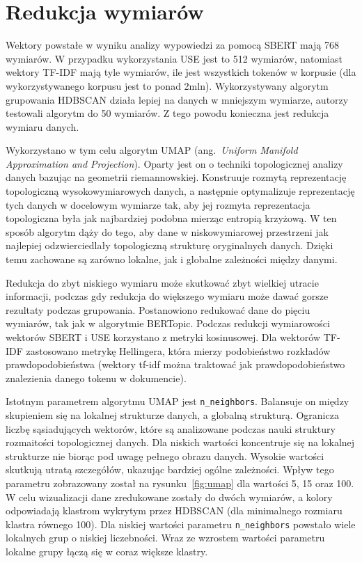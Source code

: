 \section{Redukcja wymiarów}
	Wektory powstałe w wyniku analizy wypowiedzi za pomocą SBERT mają 768 wymiarów.
	W przypadku wykorzystania USE jest to 512 wymiarów, natomiast wektory TF-IDF mają tyle wymiarów,
		ile jest wszystkich tokenów w korpusie (dla wykorzystywanego korpusu jest to ponad 2mln).
	Wykorzystywany algorytm grupowania HDBSCAN działa lepiej na danych w mniejszym wymiarze,
		autorzy testowali algorytm do 50 wymiarów\cite{HDBSCAN}.
	Z tego powodu konieczna jest redukcja wymiaru danych.
	
	Wykorzystano w tym celu algorytm UMAP (ang.\ \emph{Uniform Manifold Approximation and Projection})\cite{UMAP}.
	Oparty jest on o techniki topologicznej analizy danych bazując na geometrii riemannowskiej.
	Konstruuje rozmytą reprezentację topologiczną wysokowymiarowych danych,
		a następnie optymalizuje reprezentację tych danych w docelowym wymiarze tak,
		aby jej rozmyta reprezentacja topologiczna była jak najbardziej podobna mierząc entropią krzyżową.
	W ten sposób algorytm dąży do tego, aby dane w niskowymiarowej przestrzeni jak najlepiej odzwierciedlały topologiczną strukturę oryginalnych danych.
	Dzięki temu zachowane są zarówno lokalne, jak i globalne zależności między danymi.

	Redukcja do zbyt niskiego wymiaru może skutkować zbyt wielkiej utracie informacji,
		podczas gdy redukcja do większego wymiaru może dawać gorsze rezultaty podczas grupowania.
	Postanowiono redukować dane do pięciu wymiarów, tak jak w algorytmie BERTopic.
	Podczas redukcji wymiarowości wektorów SBERT i USE korzystano z metryki kosinusowej.
	Dla wektorów TF-IDF zastosowano metrykę Hellingera, która mierzy podobieństwo rozkładów prawdopodobieństwa
		(wektory tf-idf można traktować jak prawdopodobieństwo znalezienia danego tokenu w dokumencie).
	
	Istotnym parametrem algorytmu UMAP jest \verb|n_neighbors|.
	Balansuje on między skupieniem się na lokalnej strukturze danych, a globalną strukturą.
	Ogranicza liczbę sąsiadujących wektorów, które są analizowane podczas nauki struktury rozmaitości topologicznej danych.
	Dla niskich wartości koncentruje się na lokalnej strukturze nie biorąc pod uwagę pełnego obrazu danych.
	Wysokie wartości skutkują utratą szczegółów, ukazując bardziej ogólne zależności.
	Wpływ tego parametru zobrazowany został na rysunku~\ref{fig:umap} dla wartości 5, 15 oraz 100.
	W celu wizualizacji dane zredukowane zostały do dwóch wymiarów,
		a kolory odpowiadają klastrom wykrytym przez HDBSCAN (dla minimalnego rozmiaru klastra równego 100).
	Dla niskiej wartości parametru \verb|n_neighbors| powstało wiele lokalnych grup o niskiej liczebności.
	Wraz ze wzrostem wartości parametru lokalne grupy łączą się w coraz większe klastry.

